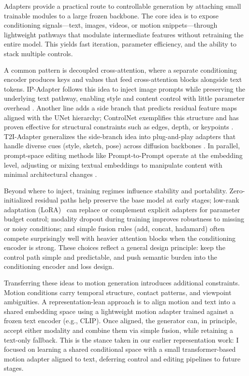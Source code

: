 \documentclass[a4paper,12pt]{article}
\begin{document}
Adapters provide a practical route to controllable generation by attaching small trainable modules to a large frozen backbone. The core idea is to expose conditioning signals—text, images, videos, or motion snippets—through lightweight pathways that modulate intermediate features without retraining the entire model. This yields fast iteration, parameter efficiency, and the ability to stack multiple controls.

A common pattern is decoupled cross-attention, where a separate conditioning encoder produces keys and values that feed cross-attention blocks alongside text tokens. IP-Adapter follows this idea to inject image prompts while preserving the underlying text pathway, enabling style and content control with little parameter overhead \cite{ye2023ip}. Another line adds a side branch that predicts residual feature maps aligned with the UNet hierarchy; ControlNet exemplifies this structure and has proven effective for structural constraints such as edges, depth, or keypoints \cite{zhang2023adding}. T2I-Adapter generalizes the side-branch idea into plug-and-play adapters that handle diverse cues (style, sketch, pose) across diffusion backbones \cite{mou2024t2i}. In parallel, prompt-space editing methods like Prompt-to-Prompt operate at the embedding level, adjusting or mixing textual embeddings to manipulate content with minimal architectural changes \cite{hertz2022prompt}.

Beyond where to inject, training regimes influence stability and portability. Zero-initialized residual paths help preserve the base model at early stages; low-rank adaptation (LoRA)~\cite{hu2022lora} can replace or complement explicit adapters for parameter budget control; modality dropout during training improves robustness to missing or noisy conditions; and simple fusion rules (add, concat, hadamard) often compete surprisingly well with heavier attention blocks when the conditioning encoder is strong. These choices reflect a general design principle: keep the control path simple and predictable, and push semantic burden into the conditioning encoder and loss design.

Transferring these ideas to motion generation introduces additional constraints. Motion conditions carry temporal structure, contact patterns, and viewpoint ambiguities. A representation-lean approach is to align motion and text into a shared embedding space using a lightweight motion adapter trained against a frozen text encoder (e.g., CLIP). Once aligned, the generator can, in principle, accept either modality and combine them via simple fusion, while retaining a text-only fallback. This is the stance taken in our earlier representation work: I focused on learning a shared conditional space with a small transformer-based motion adapter aligned to text, deferring control and editing pipelines to future stages.
\end{document}
